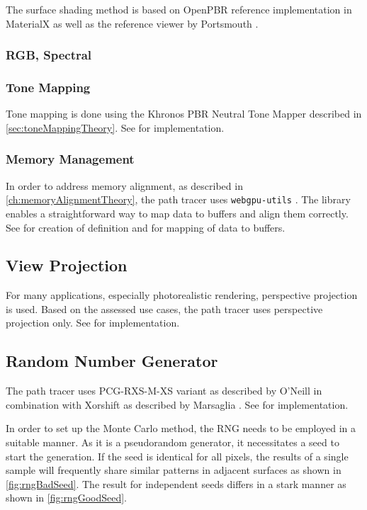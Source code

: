 The surface shading method is based on \gls{OpenPBR} reference implementation in \gls{MaterialX} as well as the reference viewer by Portsmouth \cite{openPbrViewer}.

\subsubsection{RGB, Spectral}

\subsubsection{Tone Mapping}

Tone mapping is done using the Khronos PBR Neutral Tone Mapper described in \autoref{sec:toneMappingTheory}. See  for implementation.

\subsubsection{Memory Management}

In order to address memory alignment, as described in \autoref{ch:memoryAlignmentTheory}, the path tracer uses \texttt{webgpu-utils} \cite{webgpuUtilsLib}. The library enables a straightforward way to map data to buffers and align them correctly. See  for creation of definition and  for mapping of data to buffers.


\subsection{View Projection}

For many applications, especially photorealistic rendering, perspective projection is used. Based on the assessed use cases, the path tracer uses perspective projection only. See  for implementation.

\subsection{Random Number Generator}

The path tracer uses PCG-RXS-M-XS variant as described by O’Neill \cite{o2014pcg} in combination with Xorshift as described by Marsaglia \cite{marsaglia2003xorshift}. See  for implementation.

In order to set up the Monte Carlo method, the \gls{RNG} needs to be employed in a suitable manner. As it is a pseudorandom generator, it necessitates a seed to start the generation. If the seed is identical for all pixels, the results of a single sample will frequently share similar patterns in adjacent surfaces as shown in \autoref{fig:rngBadSeed}. The result for independent seeds differs in a stark manner as shown in \autoref{fig:rngGoodSeed}.


